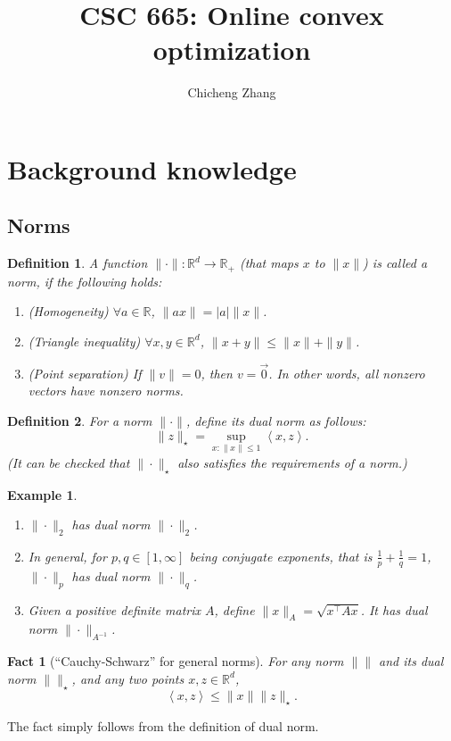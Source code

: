 \documentclass{article}
\title{CSC 665: Online convex optimization}
\author{Chicheng Zhang}
\newtheorem{example}{Example}
\newtheorem{definition}{Definition}
\newtheorem{fact}{Fact}
\newcommand{\RR}{\mathbb{R}} %
\newcommand{\inner}[2]{\left\langle #1,#2 \right\rangle}
\begin{document}
\maketitle

\section{Background knowledge}

\subsection{Norms}
\begin{definition}
A function $\| \cdot \|: \RR^d \to \RR_+$ (that maps $x$ to $\|x\|$) is called a norm, if the following holds:
\begin{enumerate}
\item(Homogeneity) $\forall a \in \RR$, $\| ax \| = |a| \| x \|$.
\item(Triangle inequality) $\forall x, y \in \RR^d$, $\| x + y \| \leq \| x \| + \|y\|$.
\item(Point separation) If $\| v \| = 0$, then $v = \vec{0}$. In other words, all nonzero vectors have nonzero norms.
\end{enumerate}
\end{definition}

\begin{definition}
For a norm $\| \cdot \|$, define its dual norm as follows:
\[ \| z \|_\star = \sup_{x: \| x \| \leq 1} \inner{x}{z}. \]
(It can be checked that $\| \cdot \|_\star$ also satisfies the requirements of a norm.)
\end{definition}

\begin{example}
\begin{enumerate}
  \item $\| \cdot \|_2$ has dual norm $\| \cdot \|_2$.
  \item In general, for $p, q \in [1,\infty]$ being conjugate exponents, that is $\frac1p + \frac1q = 1$, $\| \cdot\|_p$ has dual norm $\| \cdot \|_q$.
  \item Given a positive definite matrix $A$, define $\| x \|_A = \sqrt{x^\top A x}$. It has dual norm $\| \cdot \|_{A^{-1}}$.
\end{enumerate}
\end{example}

\begin{fact}[``Cauchy-Schwarz'' for general norms]
For any norm $\| \|$ and its dual norm $\| \|_\star$, and any two points
$x, z \in \RR^d$,
\[ \inner{x}{z} \leq \| x \| \| z \|_\star. \]
\end{fact}
The fact simply follows from the definition of dual norm.
\end{document}
